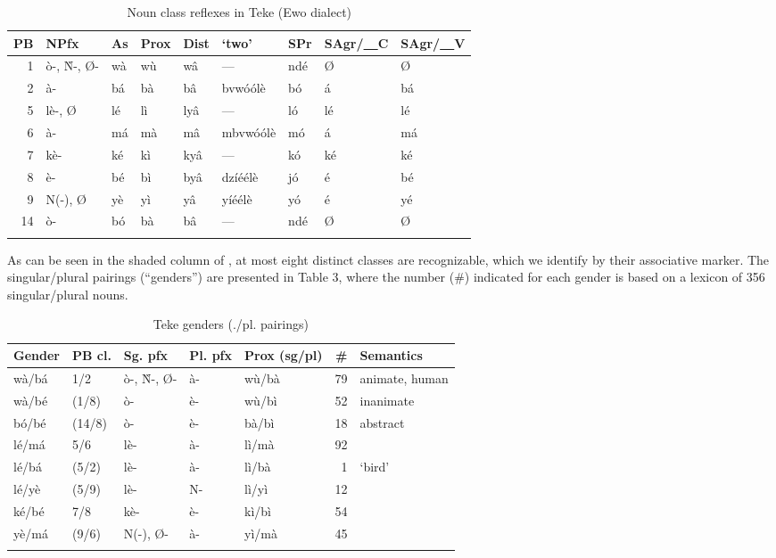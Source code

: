 \documentclass[output=paper,,modfonts,nonflat]{langsci/langscibook}
\begin{document}
\begin{table}[!htbp]
\caption{\small{Noun class reflexes in Teke (Ewo dialect)}}
\label{table2}
\begin{small}
\begin{tabular}{rllllllll}
  \lsptoprule
PB	&	NPfx	&	\cellcolor{gray!60}As	&	Prox	&	Dist	&	`two’	&	SPr	&	SAgr/\underline{~~}C	&	SAgr/\underline{~~}V	\\	
\midrule
1	&	ò-, Ǹ-, Ø-	&	\cellcolor{gray!60}wà	&	wù	&	wâ	&	---	&	ndé	&	Ø	&	Ø	\\	
2	&	à-	&	\cellcolor{gray!60}bá	&	bà	&	bâ	&	bvwóólè	&	bó	&	á	&	bá	\\	
5	&	lè-, Ø	&	\cellcolor{gray!60}lé	&	lì	&	lyâ	&	---	&	ló	&	lé	&	lé	\\	
6	&	à-	&	\cellcolor{gray!60}má	&	mà	&	mâ	&	mbvwóólè	&	mó	&	á	&	má	\\	
7	&	kè-	&	\cellcolor{gray!60}ké	&	kì	&	kyâ	&	---	&	kó	&	ké	&	ké	\\	
8	&	è-	&	\cellcolor{gray!60}bé	&	bì	&	byâ	&	dzíéélè	&	jó	&	é	&	bé	\\	
9	&	N(-), Ø	&	\cellcolor{gray!60}yè	&	yì	&	yâ	&	yíéélè	&	yó	&	é	&	yé	\\	
14	&	ò-	&	\cellcolor{gray!60}bó	&	bà	&	bâ	&	---	&	ndé	&	Ø	&	Ø	\\
  \lspbottomrule
\end{tabular}
\end{small}
\end{table}

As can be seen in the shaded column of , at most eight distinct classes are recognizable, which we identify by their associative marker. The singular/plural pairings (“genders”) are presented in Table 3, where the number (\#) indicated for each gender is based on a lexicon of 356 singular/plural nouns.

\begin{table}[!htbp]
\caption{Teke genders (./pl. pairings)}
\label{table3}
\begin{small}
\begin{tabular}{lllllrl}
  \lsptoprule
Gender	&	PB cl.	&	Sg. pfx	&	Pl. pfx	&	Prox (sg/pl)	&	\#	&	Semantics	\\	
\midrule
wà/bá	&	1/2	&	ò-, Ǹ-, Ø-	&	  à-	&	wù/bà	&	79	&	animate, human	\\	
wà/bé	&	(1/8)	&	ò-	&	  è-	&	wù/bì	&	52	&	inanimate	\\	
bó/bé	&	(14/8)	&	ò-	&	  è-	&	bà/bì	&	18	&	abstract	\\	
lé/má	&	5/6	&	lè-	&	  à-	&	lì/mà	&	92	&		\\	
lé/bá	&	(5/2)	&	lè-	&	  à-	&	lì/bà	&	1	&	`bird’ 	\\	
lé/yè	&	(5/9)	&	lè-	&	  N-	&	lì/yì	&	12	&		\\	
ké/bé	&	7/8	&	kè-	&	  è-	&	kì/bì	&	54	&		\\	
yè/má	&	(9/6)	&	N(-), Ø-	&	  à-	&	yì/mà	&	45	&		\\	
  \lspbottomrule
\end{tabular}
\end{small}
\end{table}
\end{document}

